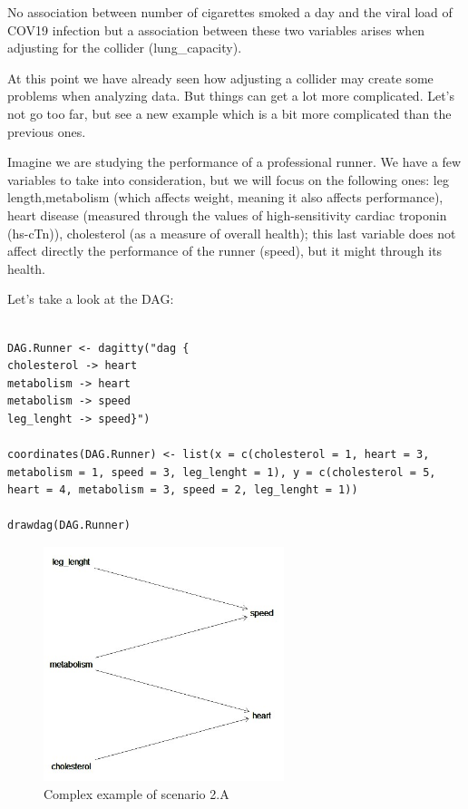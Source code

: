 \documentclass{article}
\begin{document}
No association between number of cigarettes smoked a day and the viral load of COV19 infection but a association between these two variables arises when  adjusting for the collider (lung\_capacity).\par
At this point we have already seen how adjusting a collider may create some problems when analyzing data. But things can get a lot more complicated. Let's  not go too far, but see a new example which is a bit more complicated than the previous ones.\par
Imagine we are studying the performance of a professional runner. We have a few variables to take into consideration, but we will focus on the following ones: leg length,metabolism (which affects weight, meaning it also affects performance), heart disease (measured through the values of high-sensitivity cardiac troponin  (hs-cTn)), cholesterol (as a measure of overall health); this last variable  does not affect directly the performance of the runner (speed), but it might through its health. \par
Let's take a look at the DAG:\par

\begin{lstlisting}

DAG.Runner <- dagitty("dag {
cholesterol -> heart
metabolism -> heart
metabolism -> speed
leg_lenght -> speed}")

coordinates(DAG.Runner) <- list(x = c(cholesterol = 1, heart = 3, metabolism = 1, speed = 3, leg_lenght = 1), y = c(cholesterol = 5, heart = 4, metabolism = 3, speed = 2, leg_lenght = 1))
                                       
drawdag(DAG.Runner)

\end{lstlisting}

\begin{figure}[h]
\caption{Complex example of scenario 2.A}
\includegraphics[width=7cm]{DAG_Runner.png}
\centering
\end{figure}
\end{document}
